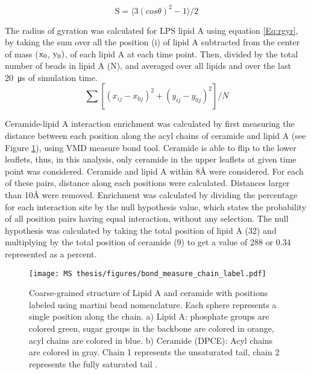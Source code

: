 \documentclass[10pt, letterpaper]{article}
\begin{document}
\begin{equation}
\label{Eq:order}
\mathrm{S} = \langle 3(cos\theta)^2 -1 \rangle /2
\end{equation}

The radius of gyration was calculated for LPS lipid A using equation
\ref{Eq:rgyr}, by taking the sum over all the position (i) of lipid A subtracted from the center of mass ($\rm x_0$, $\rm y_0)$, of each lipid A at each time point. Then, divided by the total number of beads in lipid A (N), and averaged over all lipids and over the last \SI{20}{\micro\second} of simulation time.
\begin{equation}
\label{Eq:rgyr} %
\sum[(x_{ij}-x_{0j})^2+(y_{ij}-y_{0j})^2]/N
\end{equation}

Ceramide-lipid A interaction enrichment was calculated by first measuring the distance between each position along the acyl chains of ceramide and lipid A (see Figure \ref{fig:bond}), using VMD measure bond tool. Ceramide is able to flip to the lower leaflets, thus, in this analysis, only ceramide in the upper leaflets at given time point was considered. Ceramide and lipid A within 8\si{\angstrom} were considered. For each of these pairs, distance along each positions were calculated. Distances larger than 10\si{\angstrom} were removed. Enrichment was calculated by dividing the percentage for each interaction site by the null hypothesis value, which states the probability of all position pairs having equal interaction, without any selection. The null hypothesis was calculated by taking the total position of lipid A (32) and multiplying by the total position of ceramide (9) to get a value of 288 or 0.34 represented as a percent.
\begin{figure}[H]
  \centerline{\texttt{[image: MS thesis/figures/bond\_measure\_chain\_label.pdf]}}
  \caption[Coarse-grained ceramide and lipid A structure]{Coarse-grained structure of Lipid A and ceramide with positions labeled using martini bead nomenclature. Each sphere represents a single position along the chain. a) Lipid A: phosphate groups are colored green, sugar groups in the backbone are colored in orange, acyl chains are colored in blue. b) Ceramide (DPCE): Acyl chains are colored in gray. Chain 1 represents the unsaturated tail, chain 2 represents the fully saturated tail \cite{marrink2007martini, hsu2016molecular}. }
  \label{fig:bond}
\end{figure}
\end{document}
